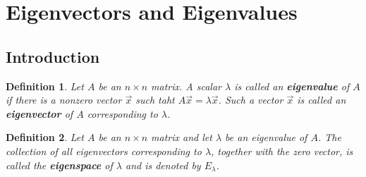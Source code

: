 \documentclass{article}
\theoremstyle{sltheorem}
\newtheorem{definition}{Definition}[section]
\begin{document}
\section{Eigenvectors and Eigenvalues}
\subsection{Introduction}
\begin{definition}
    Let $A$ be an $n\times n$ matrix. A scalar $\lambda$ is called an \textbf{eigenvalue} of $A$ if there is a nonzero vector $\vec x$ such taht $A\vec x=\lambda\vec x$. Such a vector $\vec x$ is called an \textbf{eigenvector} of $A$ corresponding to $\lambda$.
\end{definition}
\begin{definition}
    Let $A$ be an $n\times n$ matrix and let $\lambda$ be an eigenvalue of $A$. The collection of all eigenvectors corresponding to $\lambda$, together with the zero vector, is called the \textbf{eigenspace} of $\lambda$ and is denoted by $E_\lambda$.
\end{definition}
\end{document}
